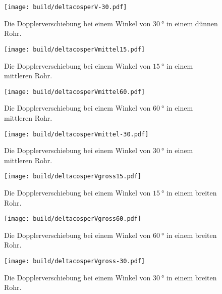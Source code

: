 \begin{figure}
 \centering
 \caption{Die Dopplerverschiebung bei einem Winkel von $\SI{30}{\degree}$ in einem dünnen Rohr.}
 \texttt{[image: build/deltacosperV-30.pdf]}
 \label{fig:k30}
\end{figure}

\begin{figure}
 \centering
 \caption{Die Dopplerverschiebung bei einem Winkel von $\SI{15}{\degree}$ in einem mittleren Rohr.}
 \texttt{[image: build/deltacosperVmittel15.pdf]}
 \label{fig:m15}
\end{figure}

\begin{figure}
 \centering
 \caption{Die Dopplerverschiebung bei einem Winkel von $\SI{60}{\degree}$ in einem mittleren Rohr.}
 \texttt{[image: build/deltacosperVmittel60.pdf]}
 \label{fig:m60}
\end{figure}

\begin{figure}
 \centering
 \caption{Die Dopplerverschiebung bei einem Winkel von $\SI{30}{\degree}$ in einem mittleren Rohr.}
 \texttt{[image: build/deltacosperVmittel-30.pdf]}
 \label{fig:m30}
\end{figure}

\begin{figure}
 \centering
 \caption{Die Dopplerverschiebung bei einem Winkel von $\SI{15}{\degree}$ in einem breiten Rohr.}
 \texttt{[image: build/deltacosperVgross15.pdf]}
 \label{fig:g15}
\end{figure}

\begin{figure}
 \centering
 \caption{Die Dopplerverschiebung bei einem Winkel von $\SI{60}{\degree}$ in einem breiten Rohr.}
 \texttt{[image: build/deltacosperVgross60.pdf]}
 \label{fig:g60}
\end{figure}

\begin{figure}
 \centering
 \caption{Die Dopplerverschiebung bei einem Winkel von $\SI{30}{\degree}$ in einem breiten Rohr.}
 \texttt{[image: build/deltacosperVgross-30.pdf]}
 \label{fig:g30}
\end{figure}

